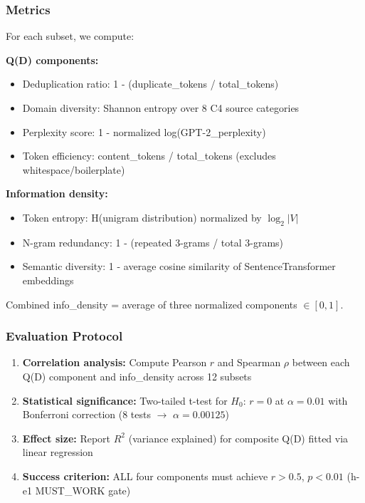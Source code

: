 \subsubsection{Metrics}

For each subset, we compute:

\textbf{Q(D) components:}
\begin{itemize}
\item Deduplication ratio: 1 - (duplicate\_tokens / total\_tokens)
\item Domain diversity: Shannon entropy over 8 C4 source categories
\item Perplexity score: 1 - normalized log(GPT-2\_perplexity)
\item Token efficiency: content\_tokens / total\_tokens (excludes whitespace/boilerplate)
\end{itemize}

\textbf{Information density:}
\begin{itemize}
\item Token entropy: H(unigram distribution) normalized by $\log_2|V|$
\item N-gram redundancy: 1 - (repeated 3-grams / total 3-grams)
\item Semantic diversity: 1 - average cosine similarity of SentenceTransformer embeddings
\end{itemize}

Combined info\_density = average of three normalized components $\in [0,1]$.

\subsubsection{Evaluation Protocol}

\begin{enumerate}
\item \textbf{Correlation analysis:} Compute Pearson $r$ and Spearman $\rho$ between each Q(D) component and info\_density across 12 subsets
\item \textbf{Statistical significance:} Two-tailed t-test for $H_0$: $r = 0$ at $\alpha = 0.01$ with Bonferroni correction (8 tests $\rightarrow$ $\alpha = 0.00125$)
\item \textbf{Effect size:} Report $R^2$ (variance explained) for composite Q(D) fitted via linear regression
\item \textbf{Success criterion:} ALL four components must achieve $r > 0.5$, $p < 0.01$ (h-e1 MUST\_WORK gate)
\end{enumerate}

